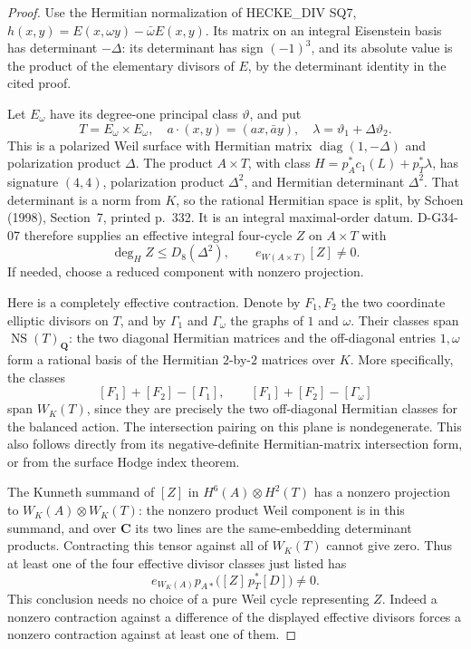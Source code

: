 \begin{proof}
Use the Hermitian normalization of HECKE\_DIV SQ7,
$h(x,y)=E(x,\omega y)-\bar\omega E(x,y)$.
Its matrix on an integral Eisenstein basis has determinant $-\Delta$:
its determinant has sign $(-1)^3$, and its absolute value is the
product of the elementary divisors of $E$, by the determinant identity
in the cited proof.

Let $E_\omega$ have its degree-one principal class $\vartheta$, and put
\[
 T=E_\omega\times E_\omega,\quad
 a\cdot(x,y)=(ax,\bar a y),\quad
 \lambda=\vartheta_1+\Delta\vartheta_2.
\]
This is a polarized Weil surface with Hermitian matrix
$\operatorname{diag}(1,-\Delta)$ and polarization product $\Delta$.
The product $A\times T$, with class
$H=p_A^*c_1(L)+p_T^*\lambda$, has signature $(4,4)$, polarization
product $\Delta^2$, and Hermitian determinant $\Delta^2$.
That determinant is a norm from $K$, so the rational Hermitian space
is split, by Schoen (1998), Section~7, printed p.~332.
It is an integral maximal-order datum. D-G34-07 therefore supplies an
effective integral four-cycle $Z$ on $A\times T$ with
\[
 \deg_H Z\le D_8(\Delta^2),\qquad e_{W(A\times T)}[Z]\ne0.
\]
If needed, choose a reduced component with nonzero projection.

Here is a completely effective contraction. Denote by $F_1,F_2$
the two coordinate elliptic divisors on $T$, and by $\Gamma_1$ and
$\Gamma_\omega$ the graphs of $1$ and $\omega$. Their classes span
$\operatorname{NS}(T)_\mathbf Q$: the two diagonal Hermitian matrices
and the off-diagonal entries $1,\omega$ form a rational basis of
the Hermitian $2$-by-$2$ matrices over $K$. More specifically, the
classes
\[
 [F_1]+[F_2]-[\Gamma_1],\qquad
 [F_1]+[F_2]-[\Gamma_\omega]
\]
span $W_K(T)$, since they are precisely the two off-diagonal
Hermitian classes for the balanced action. The intersection pairing
on this plane is nondegenerate. This also follows directly from its
negative-definite Hermitian-matrix intersection form, or from the
surface Hodge index theorem.

The Kunneth summand of $[Z]$ in
$H^6(A)\otimes H^2(T)$ has a nonzero projection to
$W_K(A)\otimes W_K(T)$: the nonzero product Weil component is in
this summand, and over $\mathbf C$ its two lines are the same-embedding
determinant products. Contracting this tensor against all of
$W_K(T)$ cannot give zero. Thus at least one of the four effective
divisor classes just listed has
\[
 e_{W_K(A)}p_{A*}\bigl([Z]\,p_T^*[D]\bigr)\ne0.
\]
This conclusion needs no choice of a pure Weil cycle representing $Z$.
Indeed a nonzero contraction against a difference of the displayed
effective divisors forces a nonzero contraction against at least one
of them.


\end{proof}
